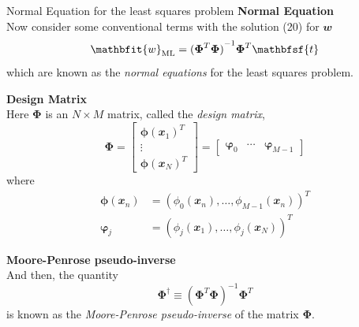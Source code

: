 \documentclass{bredelebeamer}
\begin{document}
\begin{frame}{Normal Equation for the least squares problem}
  \textbf{Normal Equation} \\
  Now consider some conventional terms with the solution (20) for $\mathbfit{w}$
  $$
  \mathbfit{w}_\mathrm{ML} = {(\boldsymbol{\Phi}^T\boldsymbol{\Phi})}^{-1} \boldsymbol{\Phi}^T \mathbfsf{t}
  $$
  which are known as the \textit{normal equations} for the least squares problem.

  \vspace{0.5\baselineskip}
  \textbf{Design Matrix} \\
  Here $\boldsymbol{\Phi}$ is an $N \times M$ matrix, called the \textit{design matrix},
  \begin{equation}
    \boldsymbol{\Phi} =
    \begin{bmatrix}
      {\boldsymbol{\phi} (\mathbfit{x}_1)}^T \\
      \vdots \\
      {\boldsymbol{\phi} (\mathbfit{x}_N)}^T
    \end{bmatrix}
    =
    \begin{bmatrix}
      \boldsymbol{\varphi}_0 &
      \cdots &
      \boldsymbol{\varphi}_{M-1}
    \end{bmatrix}
  \end{equation}
  where
  \begin{equation}
    \begin{split}
      \boldsymbol{\phi} (\mathbfit{x}_n)
      &= {( \phi_0 (\mathbfit{x}_n), \ldots, \phi_{M-1} (\mathbfit{x}_n) )}^T\\
      \boldsymbol{\varphi}_j
      &= { (\phi_j (\mathbfit{x}_1), \ldots, \phi_j (\mathbfit{x}_N) )}^T
    \end{split}
  \end{equation}

  \textbf{Moore-Penrose pseudo-inverse} \\
  And then, the quantity
  \begin{equation}
    \boldsymbol{\Phi}^{\dagger} \equiv {(\boldsymbol{\Phi}^T\boldsymbol{\Phi})}^{-1} \boldsymbol{\Phi}^T
  \end{equation}
  is known as the \textit{Moore-Penrose pseudo-inverse} of the matrix $\boldsymbol{\Phi}$.
\end{frame}
\end{document}
